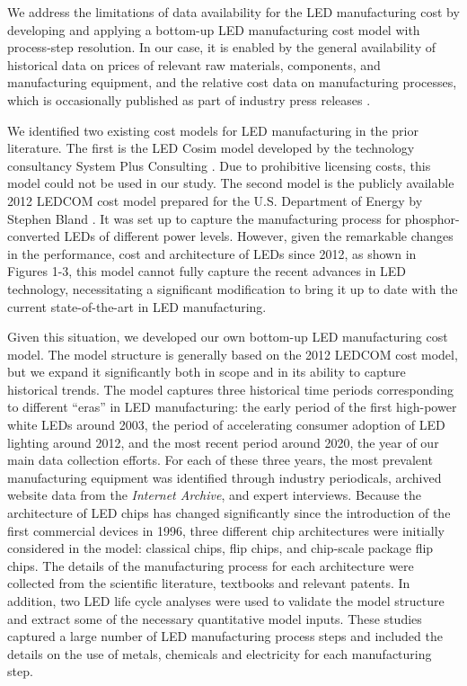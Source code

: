 \documentclass[twoside,twocolumn,9pt]{article}
\begin{document}
We address the limitations of data availability for the LED manufacturing cost by developing and applying a bottom-up LED manufacturing cost model with process-step resolution. In our case, it is enabled by the general availability of historical data on prices of relevant raw materials, components, and manufacturing equipment, and the relative cost data on manufacturing processes, which is occasionally published as part of industry press releases \cite{ledinside2013csp}\cite{seoul2015csp}. 

We identified two existing cost models for LED manufacturing in the prior literature. The first is the LED Cosim model developed by the technology consultancy System Plus Consulting \cite{cosim2013} \cite{cosim2019}. Due to prohibitive licensing costs, this model could not be used in our study. The second model is the publicly available 2012 LEDCOM cost model prepared for the U.S. Department of Energy by Stephen Bland  \cite{ledcomv2}. It was set up to capture the manufacturing process for phosphor-converted LEDs of different power levels. However, given the remarkable changes in the performance, cost and architecture of LEDs since 2012, as shown in Figures 1-3, this model cannot fully capture the recent advances in LED technology, necessitating a significant modification to bring it up to date with the current state-of-the-art in LED manufacturing.   

Given this situation, we developed our own bottom-up LED manufacturing cost model. The model structure is generally based on the 2012 LEDCOM cost model, but we expand it significantly both in scope and in its ability to capture historical trends. The model captures three historical time periods corresponding to different “eras” in LED manufacturing: the early period of the first high-power white LEDs around 2003, the period of accelerating consumer adoption of LED lighting around 2012, and the most recent period around 2020, the year of our main data collection efforts. For each of these three years, the most prevalent manufacturing equipment was identified through industry periodicals, archived website data from the \textit{Internet Archive}, and expert interviews. Because the architecture of LED chips has changed significantly since the introduction of the first commercial devices in 1996, three different chip architectures were initially considered in the model: classical chips, flip chips, and chip-scale package flip chips. The details of the manufacturing process for each architecture were collected from the scientific literature, textbooks and relevant patents. In addition, two LED life cycle analyses \cite{scholand2012life}\cite{casamayor2018comparative} were used to validate the model structure and extract some of the necessary quantitative model inputs. These studies captured a large number of LED manufacturing process steps and included the details on the use of metals, chemicals and electricity for each manufacturing step.
\end{document}
